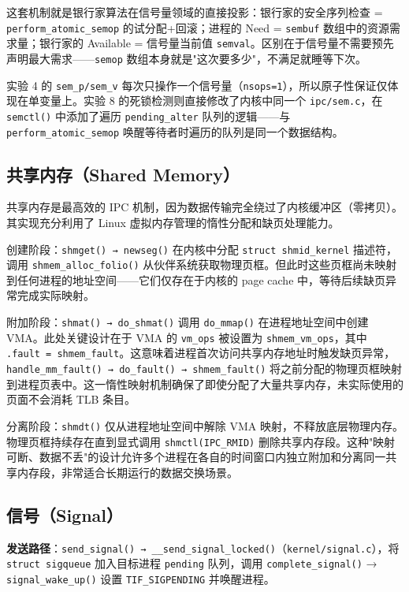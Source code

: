 \documentclass[a4paper]{article}
\begin{document}
这套机制就是银行家算法在信号量领域的直接投影：银行家的安全序列检查 = \texttt{perform\_atomic\_semop} 的试分配+回滚；进程的 Need = \texttt{sembuf} 数组中的资源需求量；银行家的 Available = 信号量当前值 \texttt{semval}。区别在于信号量不需要预先声明最大需求——\texttt{semop} 数组本身就是"这次要多少"，不满足就睡等下次。

实验 4 的 \texttt{sem\_p/sem\_v} 每次只操作一个信号量（\texttt{nsops=1}），所以原子性保证仅体现在单变量上。实验 8 的死锁检测则直接修改了内核中同一个 \texttt{ipc/sem.c}，在 \texttt{semctl()} 中添加了遍历 \texttt{pending\_alter} 队列的逻辑——与 \texttt{perform\_atomic\_semop} 唤醒等待者时遍历的队列是同一个数据结构。

\subsection{共享内存（Shared Memory）}

共享内存是最高效的 IPC 机制，因为数据传输完全绕过了内核缓冲区（零拷贝）。其实现充分利用了 Linux 虚拟内存管理的惰性分配和缺页处理能力。

创建阶段：\texttt{shmget() → newseg()} 在内核中分配 \texttt{struct shmid\_kernel} 描述符，调用 \texttt{shmem\_alloc\_folio()} 从伙伴系统获取物理页框。但此时这些页框尚未映射到任何进程的地址空间——它们仅存在于内核的 page cache 中，等待后续缺页异常完成实际映射。

附加阶段：\texttt{shmat() → do\_shmat()} 调用 \texttt{do\_mmap()} 在进程地址空间中创建 VMA。此处关键设计在于 VMA 的 \texttt{vm\_ops} 被设置为 \texttt{shmem\_vm\_ops}，其中 \texttt{.fault = shmem\_fault}。这意味着进程首次访问共享内存地址时触发缺页异常，\texttt{handle\_mm\_fault() → do\_fault() → shmem\_fault()} 将之前分配的物理页框映射到进程页表中。这一惰性映射机制确保了即使分配了大量共享内存，未实际使用的页面不会消耗 TLB 条目。

分离阶段：\texttt{shmdt()} 仅从进程地址空间中解除 VMA 映射，不释放底层物理内存。物理页框持续存在直到显式调用 \texttt{shmctl(IPC\_RMID)} 删除共享内存段。这种"映射可断、数据不丢"的设计允许多个进程在各自的时间窗口内独立附加和分离同一共享内存段，非常适合长期运行的数据交换场景。

\subsection{信号（Signal）}

\textbf{发送路径}：\texttt{send\_signal() → \_\_send\_signal\_locked()}（\texttt{kernel/signal.c}），将 \texttt{struct sigqueue} 加入目标进程 \texttt{pending} 队列，调用 \texttt{complete\_signal()} → \texttt{signal\_wake\_up()} 设置 \texttt{TIF\_SIGPENDING} 并唤醒进程。
\end{document}
